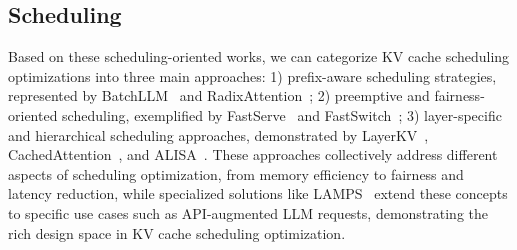\subsection{Scheduling}\label{sec:sys_sch}

Based on these scheduling-oriented works, we can categorize KV cache scheduling optimizations into three main approaches: 1) prefix-aware scheduling strategies, represented by BatchLLM~\cite{zheng2024batchllmoptimizinglargebatched} and RadixAttention~\cite{zheng2024sglangefficientexecutionstructured}; 2) preemptive and fairness-oriented scheduling, exemplified by FastServe~\cite{wu2024fastdistributedinferenceserving} and FastSwitch~\cite{shen2024fastswitchoptimizingcontextswitching}; 3) layer-specific and hierarchical scheduling approaches, demonstrated by LayerKV~\cite{xiong2024layerkvoptimizinglargelanguage}, CachedAttention~\cite{gao2024costefficientlargelanguagemodel}, and ALISA~\cite{zhao2024alisaacceleratinglargelanguage}. These approaches collectively address different aspects of scheduling optimization, from memory efficiency to fairness and latency reduction, while specialized solutions like LAMPS~\cite{shahout2024fastinferenceaugmentedlarge} extend these concepts to specific use cases such as API-augmented LLM requests, demonstrating the rich design space in KV cache scheduling optimization.

